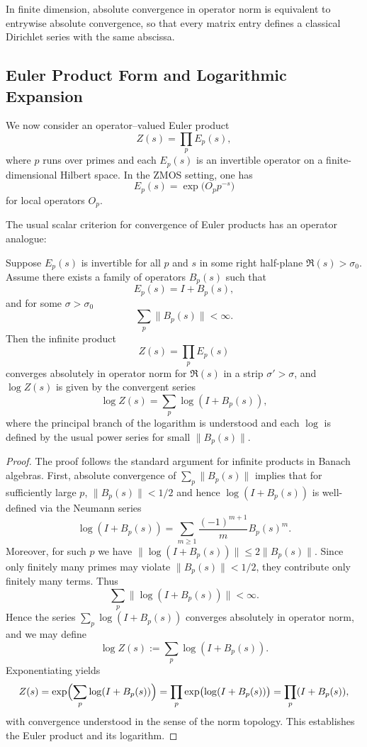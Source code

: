 \documentclass[11pt]{article}
\begin{document}
\begin{remark}
In finite dimension, absolute convergence in operator norm is equivalent
to entrywise absolute convergence, so that every matrix entry defines a
classical Dirichlet series with the same abscissa.
\end{remark}

\subsection{Euler Product Form and Logarithmic Expansion}

We now consider an operator–valued Euler product
\[
  Z(s) = \prod_{p} E_p(s),
\]
where $p$ runs over primes and each $E_p(s)$ is an invertible operator
on a finite-dimensional Hilbert space. In the ZMOS setting, one has
\[
  E_p(s) = \exp\!\bigl(O_p p^{-s}\bigr)
\]
for local operators $O_p$.

The usual scalar criterion for convergence of Euler products has an
operator analogue:

\begin{proposition}
\label{prop:euler_convergence}
Suppose $E_p(s)$ is invertible for all $p$ and $s$ in some right
half-plane $\Re(s) > \sigma_0$. Assume there exists a family of operators
$B_p(s)$ such that
\[
  E_p(s) = I + B_p(s),
\]
and for some $\sigma > \sigma_0$
\[
  \sum_{p} \|B_p(s)\| < \infty.
\]
Then the infinite product
\[
  Z(s) = \prod_{p} E_p(s)
\]
converges absolutely in operator norm for $\Re(s)$ in a strip
$\sigma' > \sigma$, and $\log Z(s)$ is given by the convergent series
\[
  \log Z(s) = \sum_{p} \log(I + B_p(s)),
\]
where the principal branch of the logarithm is understood and each $\log$
is defined by the usual power series for small $\|B_p(s)\|$.
\end{proposition}

\begin{proof}
The proof follows the standard argument for infinite products in
Banach algebras. First, absolute convergence of $\sum_p \|B_p(s)\|$
implies that for sufficiently large $p$,
$\|B_p(s)\| < 1/2$ and hence $\log(I+B_p(s))$ is well-defined via the
Neumann series
\[
  \log(I+B_p(s)) = \sum_{m\ge 1} \frac{(-1)^{m+1}}{m} B_p(s)^m.
\]
Moreover, for such $p$ we have
$\|\log(I+B_p(s))\| \le 2\|B_p(s)\|$.
Since only finitely many primes may violate $\|B_p(s)\|<1/2$, they
contribute only finitely many terms. Thus
\[
  \sum_{p} \|\log(I+B_p(s))\|
  < \infty.
\]
Hence the series $\sum_p \log(I+B_p(s))$ converges absolutely in operator
norm, and we may define
\[
  \log Z(s) := \sum_{p} \log(I + B_p(s)).
\]
Exponentiating yields
\[
  Z(s) =
  \exp\Bigl(\sum_{p} \log(I + B_p(s))\Bigr)
  = \prod_{p} \exp\bigl(\log(I+B_p(s))\bigr)
  = \prod_{p} (I+B_p(s)),
\]
with convergence understood in the sense of the norm topology. This
establishes the Euler product and its logarithm.
\end{proof}
\end{document}
